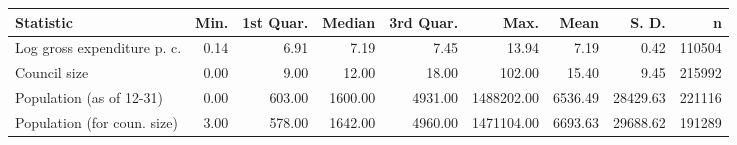 \begin{tabular}{lrrrrrrrr}
  \toprule
Statistic & Min. & 1st Quar. & Median & 3rd Quar. & Max. & Mean & S. D. & n \\ 
  \midrule
Log gross expenditure p. c. & 0.14 & 6.91 & 7.19 & 7.45 & 13.94 & 7.19 & 0.42 & 110504 \\ 
  Council size & 0.00 & 9.00 & 12.00 & 18.00 & 102.00 & 15.40 & 9.45 & 215992 \\ 
  Population (as of 12-31) & 0.00 & 603.00 & 1600.00 & 4931.00 & 1488202.00 & 6536.49 & 28429.63 & 221116 \\ 
  Population (for coun. size) & 3.00 & 578.00 & 1642.00 & 4960.00 & 1471104.00 & 6693.63 & 29688.62 & 191289 \\ 
   \bottomrule
\end{tabular}
